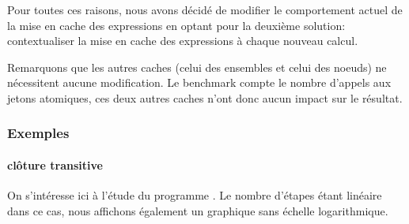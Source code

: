 \documentclass[a4paper, 11pt]{article}
\begin{document}
Pour toutes ces raisons, nous avons décidé de modifier le comportement actuel de la mise en cache des expressions
en optant pour la deuxième solution: contextualiser la mise en cache des expressions à chaque nouveau calcul.

Remarquons que les autres caches (celui des ensembles et celui des noeuds) ne nécessitent aucune modification.
Le benchmark compte le nombre d'appels aux jetons atomiques, ces deux autres caches n'ont donc aucun
impact sur le résultat.

\subsubsection{Exemples}

\paragraph{clôture transitive}

On s'intéresse ici à l'étude du programme . Le nombre d'étapes étant linéaire dans ce cas,
nous affichons également un graphique sans échelle logarithmique.
\end{document}
